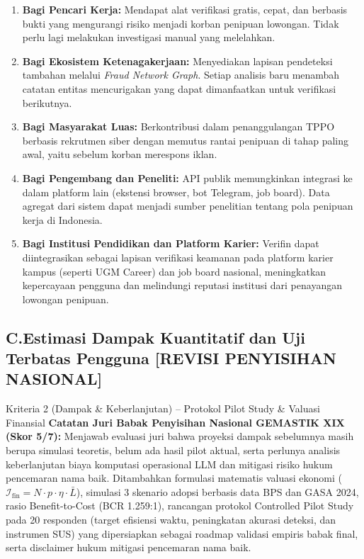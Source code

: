 \documentclass[12pt,a4paper]{article}
\begin{document}
\begin{enumerate}[label=\textbf{\arabic*.}]
\item \textbf{Bagi Pencari Kerja:} Mendapat alat verifikasi gratis, cepat, dan berbasis bukti yang
      mengurangi risiko menjadi korban penipuan lowongan. Tidak perlu lagi melakukan investigasi
      manual yang melelahkan.

\item \textbf{Bagi Ekosistem Ketenagakerjaan:} Menyediakan lapisan pendeteksi tambahan melalui
      \textit{Fraud Network Graph}. Setiap analisis baru menambah catatan entitas mencurigakan
      yang dapat dimanfaatkan untuk verifikasi berikutnya.

\item \textbf{Bagi Masyarakat Luas:} Berkontribusi dalam penanggulangan TPPO berbasis
      rekrutmen siber dengan memutus rantai penipuan di tahap paling awal, yaitu sebelum
      korban merespons iklan.

\item \textbf{Bagi Pengembang dan Peneliti:} API publik memungkinkan integrasi ke dalam platform
      lain (ekstensi browser, bot Telegram, job board). Data agregat dari sistem dapat menjadi
      sumber penelitian tentang pola penipuan kerja di Indonesia.

\item \textbf{Bagi Institusi Pendidikan dan Platform Karier:} Verifin dapat diintegrasikan sebagai
      lapisan verifikasi keamanan pada platform karier kampus (seperti UGM Career) dan job board
      nasional, meningkatkan kepercayaan pengguna dan melindungi reputasi institusi dari
      penayangan lowongan penipuan.
\end{enumerate}

\subsection*{\colorbox{yellow!50}{\textbf{C.\quad Estimasi Dampak Kuantitatif dan Uji Terbatas Pengguna}} \quad \colorbox{orange!25}{\small\textbf{[REVISI PENYISIHAN NASIONAL]}}}
{}

\begin{bannerpenyisihan}{Kriteria 2 (Dampak \& Keberlanjutan) -- Protokol Pilot Study \& Valuasi Finansial}
\textbf{Catatan Juri Babak Penyisihan Nasional GEMASTIK XIX (Skor 5/7):} Menjawab evaluasi juri bahwa proyeksi dampak sebelumnya masih berupa simulasi teoretis, belum ada hasil pilot aktual, serta perlunya analisis keberlanjutan biaya komputasi operasional LLM dan mitigasi risiko hukum pencemaran nama baik. Ditambahkan formulasi matematis valuasi ekonomi ($\mathcal{I}_{\text{fin}} = N \cdot p \cdot \eta \cdot \bar{L}$), simulasi 3 skenario adopsi berbasis data BPS dan GASA 2024, rasio Benefit-to-Cost (BCR 1.259:1), rancangan protokol Controlled Pilot Study pada 20 responden (target efisiensi waktu, peningkatan akurasi deteksi, dan instrumen SUS) yang dipersiapkan sebagai roadmap validasi empiris babak final, serta disclaimer hukum mitigasi pencemaran nama baik.
\end{bannerpenyisihan}
\vspace{0.2cm}
\end{document}
